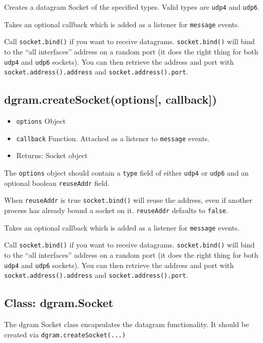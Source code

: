 Creates a datagram Socket of the specified types. Valid types are
\texttt{udp4} and \texttt{udp6}.

Takes an optional callback which is added as a listener for
\texttt{message} events.

Call \texttt{socket.bind()} if you want to receive datagrams.
\texttt{socket.bind()} will bind to the ``all interfaces'' address on a
random port (it does the right thing for both \texttt{udp4} and
\texttt{udp6} sockets). You can then retrieve the address and port with
\texttt{socket.address().address} and \texttt{socket.address().port}.

\subsection{dgram.createSocket(options{[},
callback{]})}\label{dgram.createsocketoptions-callback}

\begin{itemize}
\itemsep1pt\parskip0pt
\item
  \texttt{options} Object
\item
  \texttt{callback} Function. Attached as a listener to \texttt{message}
  events.
\item
  Returns: Socket object
\end{itemize}

The \texttt{options} object should contain a \texttt{type} field of
either \texttt{udp4} or \texttt{udp6} and an optional boolean
\texttt{reuseAddr} field.

When \texttt{reuseAddr} is true \texttt{socket.bind()} will reuse the
address, even if another process has already bound a socket on it.
\texttt{reuseAddr} defaults to \texttt{false}.

Takes an optional callback which is added as a listener for
\texttt{message} events.

Call \texttt{socket.bind()} if you want to receive datagrams.
\texttt{socket.bind()} will bind to the ``all interfaces'' address on a
random port (it does the right thing for both \texttt{udp4} and
\texttt{udp6} sockets). You can then retrieve the address and port with
\texttt{socket.address().address} and \texttt{socket.address().port}.

\subsection{Class: dgram.Socket}\label{class-dgram.socket}

The dgram Socket class encapsulates the datagram functionality. It
should be created via \texttt{dgram.createSocket(...)}

